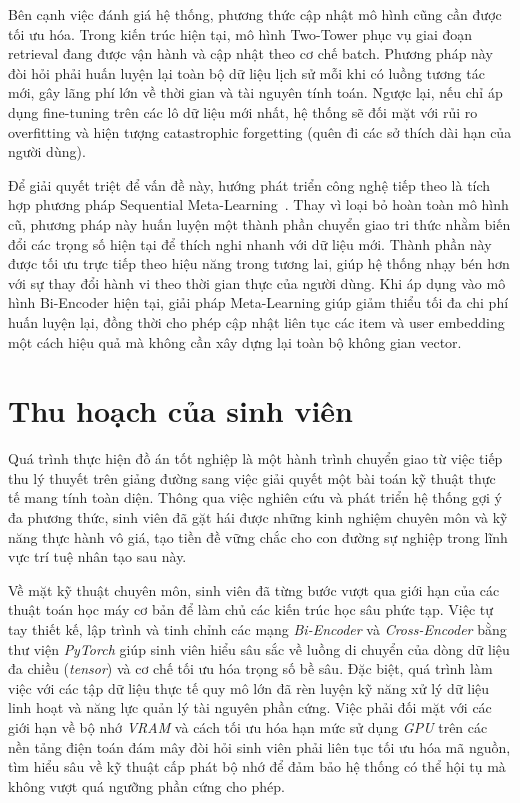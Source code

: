 Bên cạnh việc đánh giá hệ thống, phương thức cập nhật mô hình cũng cần được tối ưu hóa. Trong kiến trúc hiện tại, mô hình Two-Tower phục vụ giai đoạn retrieval đang được vận hành và cập nhật theo cơ chế batch. Phương pháp này đòi hỏi phải huấn luyện lại toàn bộ dữ liệu lịch sử mỗi khi có luồng tương tác mới, gây lãng phí lớn về thời gian và tài nguyên tính toán. Ngược lại, nếu chỉ áp dụng fine-tuning trên các lô dữ liệu mới nhất, hệ thống sẽ đối mặt với rủi ro overfitting và hiện tượng catastrophic forgetting (quên đi các sở thích dài hạn của người dùng). 

Để giải quyết triệt để vấn đề này, hướng phát triển công nghệ tiếp theo là tích hợp phương pháp Sequential Meta-Learning~\cite{44}. Thay vì loại bỏ hoàn toàn mô hình cũ, phương pháp này huấn luyện một thành phần chuyển giao tri thức nhằm biến đổi các trọng số hiện tại để thích nghi nhanh với dữ liệu mới. Thành phần này được tối ưu trực tiếp theo hiệu năng trong tương lai, giúp hệ thống nhạy bén hơn với sự thay đổi hành vi theo thời gian thực của người dùng. Khi áp dụng vào mô hình Bi-Encoder hiện tại, giải pháp Meta-Learning giúp giảm thiểu tối đa chi phí huấn luyện lại, đồng thời cho phép cập nhật liên tục các item và user embedding một cách hiệu quả mà không cần xây dựng lại toàn bộ không gian vector.

\section{Thu hoạch của sinh viên}

Quá trình thực hiện đồ án tốt nghiệp là một hành trình chuyển giao từ việc tiếp thu lý thuyết trên giảng đường sang việc giải quyết một bài toán kỹ thuật thực tế mang tính toàn diện. Thông qua việc nghiên cứu và phát triển hệ thống gợi ý đa phương thức, sinh viên đã gặt hái được những kinh nghiệm chuyên môn và kỹ năng thực hành vô giá, tạo tiền đề vững chắc cho con đường sự nghiệp trong lĩnh vực trí tuệ nhân tạo sau này.

Về mặt kỹ thuật chuyên môn, sinh viên đã từng bước vượt qua giới hạn của các thuật toán học máy cơ bản để làm chủ các kiến trúc học sâu phức tạp. Việc tự tay thiết kế, lập trình và tinh chỉnh các mạng \textit{Bi-Encoder} và \textit{Cross-Encoder} bằng thư viện \textit{PyTorch} giúp sinh viên hiểu sâu sắc về luồng di chuyển của dòng dữ liệu đa chiều (\textit{tensor}) và cơ chế tối ưu hóa trọng số bề sâu. Đặc biệt, quá trình làm việc với các tập dữ liệu thực tế quy mô lớn đã rèn luyện kỹ năng xử lý dữ liệu linh hoạt và năng lực quản lý tài nguyên phần cứng. Việc phải đối mặt với các giới hạn về bộ nhớ \textit{VRAM} và cách tối ưu hóa hạn mức sử dụng \textit{GPU} trên các nền tảng điện toán đám mây đòi hỏi sinh viên phải liên tục tối ưu hóa mã nguồn, tìm hiểu sâu về kỹ thuật cấp phát bộ nhớ để đảm bảo hệ thống có thể hội tụ mà không vượt quá ngưỡng phần cứng cho phép.

